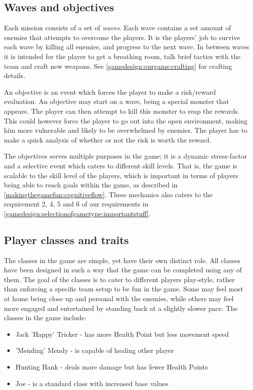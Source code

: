 \subsection{Waves and objectives}\label{gamedesign:ourgame:objectives}
Each mission consists of a set of \emph{waves}. Each wave contains a set amount of enemies that attempts to overcome the players. It is the players' job to survive each wave by killing all enemies, and progress to the next wave. In between waves it is intended for the player to get a breathing room, talk brief tactics with the team and craft new weapons. See \ref{gamedesign:ourgame:crafting} for crafting details. 

An objective is an event which forces the player to make a risk/reward evaluation.
An objective may start on a wave, being a special monster that appears.
The player can then attempt to kill this monster to reap the rewards.
This could however force the player to go out into the open environment, making him more vulnerable and likely to be overwhelmed by enemies. The player has to make a quick analysis of whether or not the risk is worth the reward.

The objectives serves multiple purposes in the game; it is a dynamic
stress-factor and a selective event which caters to different skill levels.
That is, the game is scalable to the skill level of the players, which is important in terms of players being able to reach goals within the game, as described in \ref{makingthegamefun:cognitiveflow}.
These mechanics also caters to the requirement 2, 4, 5 and 6 of our requirements in \ref{gamedesign:selectionofgametype:importantstuff}.

\subsection{Player classes and traits}\label{gamedesign:ourgame:classes}
The classes in the game are simple, yet have their own distinct role.
All classes have been designed in such a way that the game can be completed using any of them.
The goal of the classes is to cater to different players play-style, rather than enforcing a specific team setup to be fun in the game.
Some may feel most at home being close up and personal with the enemies, while others may feel more engaged and entertained by standing back at a slightly slower pace.
The classes in the game include:

\begin{itemize}
\item Jack 'Happy' Tricker - has more Health Point but less movement speed
\item 'Mending' Mendy - is capable of healing other player
\item Hunting Hank - deals more damage but has fewer Health Points
\item Joe - is a standard class with increased base values
\end{itemize}

